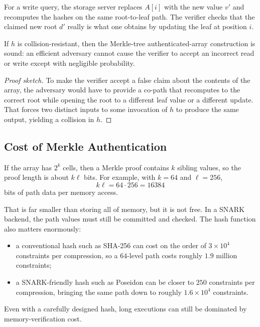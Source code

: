 \documentclass[11pt]{article}
\begin{document}
For a write query, the storage server replaces $A[i]$ with the new value $v'$
and recomputes the hashes on the same root-to-leaf path.  The verifier checks
that the claimed new root $d'$ really is what one obtains by updating the leaf
at position $i$.

\begin{proposition}
If $h$ is collision-resistant, then the Merkle-tree authenticated-array
construction is sound: an efficient adversary cannot cause the verifier to
accept an incorrect read or write except with negligible probability.
\end{proposition}

\begin{proof}[Proof sketch]
To make the verifier accept a false claim about the contents of the array, the
adversary would have to provide a co-path that recomputes to the correct root
while opening the root to a different leaf value or a different update.  That
forces two distinct inputs to some invocation of $h$ to produce the same
output, yielding a collision in $h$.
\end{proof}

\subsection{Cost of Merkle Authentication}

If the array has $2^k$ cells, then a Merkle proof contains $k$ sibling values,
so the proof length is about $k\ell$ bits.  For example, with $k=64$ and
$\ell=256$,
\[
  k\ell = 64 \cdot 256 = 16384
\]
bits of path data per memory access.

That is far smaller than storing all of memory, but it is not free.  In a
SNARK backend, the path values must still be committed and checked.  The hash
function also matters enormously:
\begin{itemize}
  \item a conventional hash such as SHA-256 can cost on the order of
        $3\times 10^4$ constraints per compression, so a $64$-level path costs
        roughly $1.9$ million constraints;
  \item a SNARK-friendly hash such as Poseidon can be closer to $250$
        constraints per compression, bringing the same path down to roughly
        $1.6\times 10^4$ constraints.
\end{itemize}

Even with a carefully designed hash, long executions can still be dominated by
memory-verification cost.
\end{document}

